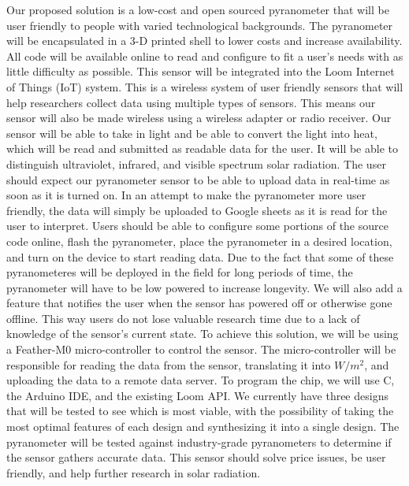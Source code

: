 \documentclass[10pt,draftclsnofoot,onecolumn,letterpaper]{article}
\begin{document}
    {\fontsize{10pt}{12.0pt}\selectfont Our proposed solution is a low-cost and open sourced pyranometer that will be user friendly to people with varied technological backgrounds. The pyranometer will be encapsulated in a 3-D printed shell to lower costs and increase availability. All code will be available online to read and configure to fit a user's needs with as little difficulty as possible. This sensor will be integrated into the Loom Internet of Things (IoT) system. This is a wireless system of user friendly sensors that will help researchers collect data using multiple types of sensors. This means our sensor will also be made wireless using a wireless adapter or radio receiver. Our sensor will be able to take in light and be able to convert the light into heat, which will be read and submitted as readable data for the user. It will be able to distinguish ultraviolet, infrared, and visible spectrum solar radiation. The user should expect our pyranometer sensor to be able to upload data in real-time as soon as it is turned on. In an attempt to make the pyranometer more user friendly, the data will simply be uploaded to Google sheets as it is read for the user to interpret. Users should be able to configure some portions of the source code online, flash the pyranometer, place the pyranometer in a desired location, and turn on the device to start reading data. Due to the fact that some of these pyranometeres will be deployed in the field for long periods of time, the pyranometer will have to be low powered to increase longevity. We will also add a feature that notifies the user when the sensor has powered off or otherwise gone offline. This way users do not lose valuable research time due to a lack of knowledge of the sensor's current state. To achieve this solution, we will be using a Feather-M0 micro-controller to control the sensor. The micro-controller will be responsible for reading the data from the sensor, translating it into $W/m^2$, and uploading the data to a remote data server. To program the chip, we will use C, the Arduino IDE, and the existing Loom API. We currently have three designs that will be tested to see which is most viable, with the possibility of taking the most optimal features of each design and synthesizing it into a single design. The pyranometer will be tested against industry-grade pyranometers to determine if the sensor gathers accurate data. This sensor should solve price issues, be user friendly, and help further research in solar radiation. \par}\par
    
\end{document}
